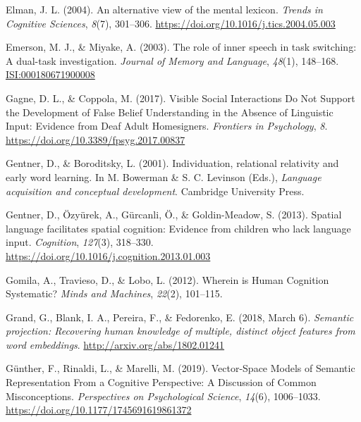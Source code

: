 \documentclass[11pt,man]{article}
\newenvironment{CSLReferences}%
  {}%
  {\par}
\begin{document}
\begin{CSLReferences}{1}{0}
\leavevmode{}%
Elman, J. L. (2004). An alternative view of the mental lexicon.
\emph{Trends in Cognitive Sciences}, \emph{8}(7), 301--306.
\url{https://doi.org/10.1016/j.tics.2004.05.003}

\leavevmode{}%
Emerson, M. J., \& Miyake, A. (2003). The role of inner speech in task
switching: {A} dual-task investigation. \emph{Journal of Memory and
Language}, \emph{48}(1), 148--168.
\href{https://ISI:000180671900008}{ISI:000180671900008}

\leavevmode{}%
Gagne, D. L., \& Coppola, M. (2017). Visible {Social Interactions Do Not
Support} the {Development} of {False Belief Understanding} in the
{Absence} of {Linguistic Input}: {Evidence} from {Deaf Adult
Homesigners}. \emph{Frontiers in Psychology}, \emph{8}.
\url{https://doi.org/10.3389/fpsyg.2017.00837}

\leavevmode{}%
Gentner, D., \& Boroditsky, L. (2001). Individuation, relational
relativity and early word learning. In M. Bowerman \& S. C. Levinson
(Eds.), \emph{Language acquisition and conceptual development}.
{Cambridge University Press}.

\leavevmode{}%
Gentner, D., Özyürek, A., Gürcanli, Ö., \& Goldin-Meadow, S. (2013).
Spatial language facilitates spatial cognition: {Evidence} from children
who lack language input. \emph{Cognition}, \emph{127}(3), 318--330.
\url{https://doi.org/10.1016/j.cognition.2013.01.003}

\leavevmode{}%
Gomila, A., Travieso, D., \& Lobo, L. (2012). Wherein is {Human
Cognition Systematic}? \emph{Minds and Machines}, \emph{22}(2),
101--115.

\leavevmode{}%
Grand, G., Blank, I. A., Pereira, F., \& Fedorenko, E. (2018, March 6).
\emph{Semantic projection: Recovering human knowledge of multiple,
distinct object features from word embeddings}.
\url{http://arxiv.org/abs/1802.01241}

\leavevmode{}%
Günther, F., Rinaldi, L., \& Marelli, M. (2019). Vector-{Space Models}
of {Semantic Representation From} a {Cognitive Perspective}: {A
Discussion} of {Common Misconceptions}. \emph{Perspectives on
Psychological Science}, \emph{14}(6), 1006--1033.
\url{https://doi.org/10.1177/1745691619861372}


\end{CSLReferences}
\end{document}
